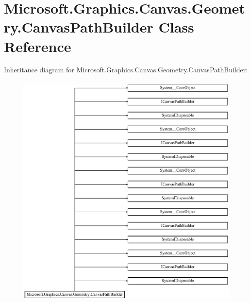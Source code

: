 \hypertarget{class_microsoft_1_1_graphics_1_1_canvas_1_1_geometry_1_1_canvas_path_builder}{}\section{Microsoft.\+Graphics.\+Canvas.\+Geometry.\+Canvas\+Path\+Builder Class Reference}
\label{class_microsoft_1_1_graphics_1_1_canvas_1_1_geometry_1_1_canvas_path_builder}
Inheritance diagram for Microsoft.\+Graphics.\+Canvas.\+Geometry.\+Canvas\+Path\+Builder\+:\begin{figure}[H]
\begin{center}
\leavevmode
\includegraphics[height=12.000000cm]{class_microsoft_1_1_graphics_1_1_canvas_1_1_geometry_1_1_canvas_path_builder}
\end{center}
\end{figure}
